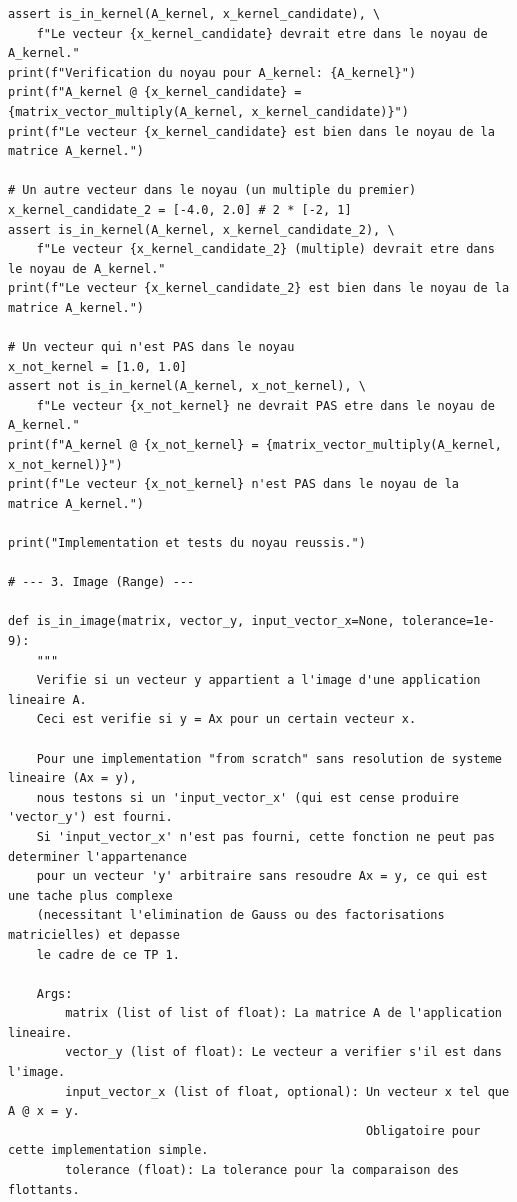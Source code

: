 \documentclass{report}
\begin{document}
\begin{verbatim}
assert is_in_kernel(A_kernel, x_kernel_candidate), \
    f"Le vecteur {x_kernel_candidate} devrait etre dans le noyau de A_kernel."
print(f"Verification du noyau pour A_kernel: {A_kernel}")
print(f"A_kernel @ {x_kernel_candidate} = {matrix_vector_multiply(A_kernel, x_kernel_candidate)}")
print(f"Le vecteur {x_kernel_candidate} est bien dans le noyau de la matrice A_kernel.")

# Un autre vecteur dans le noyau (un multiple du premier)
x_kernel_candidate_2 = [-4.0, 2.0] # 2 * [-2, 1]
assert is_in_kernel(A_kernel, x_kernel_candidate_2), \
    f"Le vecteur {x_kernel_candidate_2} (multiple) devrait etre dans le noyau de A_kernel."
print(f"Le vecteur {x_kernel_candidate_2} est bien dans le noyau de la matrice A_kernel.")

# Un vecteur qui n'est PAS dans le noyau
x_not_kernel = [1.0, 1.0]
assert not is_in_kernel(A_kernel, x_not_kernel), \
    f"Le vecteur {x_not_kernel} ne devrait PAS etre dans le noyau de A_kernel."
print(f"A_kernel @ {x_not_kernel} = {matrix_vector_multiply(A_kernel, x_not_kernel)}")
print(f"Le vecteur {x_not_kernel} n'est PAS dans le noyau de la matrice A_kernel.")

print("Implementation et tests du noyau reussis.")

# --- 3. Image (Range) ---

def is_in_image(matrix, vector_y, input_vector_x=None, tolerance=1e-9):
    """
    Verifie si un vecteur y appartient a l'image d'une application lineaire A.
    Ceci est verifie si y = Ax pour un certain vecteur x.

    Pour une implementation "from scratch" sans resolution de systeme lineaire (Ax = y),
    nous testons si un 'input_vector_x' (qui est cense produire 'vector_y') est fourni.
    Si 'input_vector_x' n'est pas fourni, cette fonction ne peut pas determiner l'appartenance
    pour un vecteur 'y' arbitraire sans resoudre Ax = y, ce qui est une tache plus complexe
    (necessitant l'elimination de Gauss ou des factorisations matricielles) et depasse
    le cadre de ce TP 1.

    Args:
        matrix (list of list of float): La matrice A de l'application lineaire.
        vector_y (list of float): Le vecteur a verifier s'il est dans l'image.
        input_vector_x (list of float, optional): Un vecteur x tel que A @ x = y.
                                                  Obligatoire pour cette implementation simple.
        tolerance (float): La tolerance pour la comparaison des flottants.


\end{verbatim}
\end{document}
